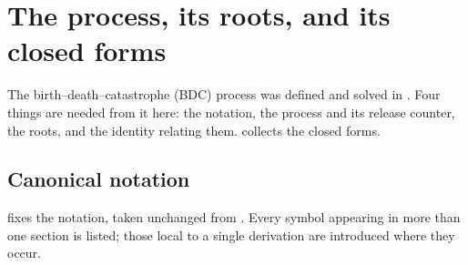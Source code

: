 \section{The process, its roots, and its closed forms}
\label{dist:sec:recap}

The birth--death--catastrophe (BDC) process was defined and solved in
\ChCore. Four things are needed from it here: the notation, the process and
its release counter, the roots, and the identity relating them.
 collects the closed forms.

\subsection{Canonical notation}
\label{dist:sec:notation-tab}

 fixes the notation, taken unchanged from \ChCore.
Every symbol appearing in more than one section is listed; those local to a
single derivation are introduced where they occur.

